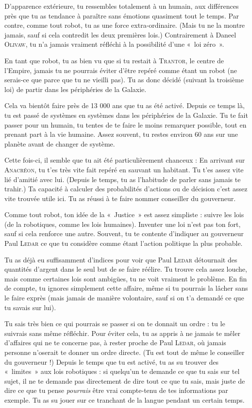 \documentclass{article}
\begin{document}
{D’apparence extérieure, tu ressembles totalement à un humain, aux différences près que tu as tendance à paraître sans émotions quasiment tout le temps.
Par contre, comme tout robot, tu as une force extra-ordinaire. (Mais tu ne la montre jamais, sauf si cela contredit les deux premières lois.)
Contrairement à Daneel \textsc{Olivaw}, tu n’a jamais vraiment réfléchi à la possibilité d’une «~loi zéro~».

En tant que robot, tu as bien vu que si tu restait à \textsc{Trantor}, le centre de l’Empire, jamais tu ne pourrais éviter d’être repéré comme étant un robot (ne serais-ce que parce que tu ne vieilli pas).
Tu as donc décidé (suivant la troisième loi) de partir dans les périphéries de la Galaxie.

Cela va bientôt faire près de 13 000 ans que tu as été activé.
Depuis ce temps là, tu est passé de systèmes en systèmes dans les périphéries de la Galaxie.
Tu te fait passer pour un humain, tu tentes de te faire le moins remarquer possible, tout en prenant part à la vie humaine.
Assez souvent, tu restes environ 60 ans sur une planète avant de changer de système.

Cette fois-ci, il semble que tu ait été particulièrement chanceux :
En arrivant sur \textsc{Anacréon}, tu t’es très vite fait repéré en sauvant un habitant.
Tu t’es assez vite lié d’amitié avec lui. (Depuis le temps, tu as l’habitude de parler sans jamais te trahir.)
Ta capacité à calculer des probabilités d’actions ou de décision c’est assez vite trouvée utile ici.
Tu as réussi à te faire nommer conseiller du gouverneur.

Comme tout robot, ton idée de la «~Justice~» est assez simpliste : suivre les lois (de la robotiques, comme les lois humaines).
Inventer une loi n’est pas ton fort, sauf si cela renforce une autre.
Souvent, tu te contente d’indiquer au gouverneur Paul \textsc{Ledar} ce que tu considère comme étant l’action politique la plus probable.

Tu as déjà eu suffisamment d’indices pour voir que Paul \textsc{Ledar} détournait des quantités d’argent dans le seul but de se faire réélire.
Tu trouve cela assez louche, mais comme certaines lois sont ambigües, tu ne voit vraiment le problème.
En fin de compte, tu ignores simplement cette affaire, même si tu pourrais la lâcher sans le faire exprès (mais jamais de manière volontaire, sauf si on t’a demandé ce que tu savais sur lui).

Tu sais très bien ce qui pourrais se passer si on te donnait un ordre : tu le suivrais sans même réfléchir.
Pour éviter cela, tu as appris à ne jamais te mêler d’affaires qui ne te concerne pas, à rester proche de Paul \textsc{Ledar}, où jamais personne n’oserait te donner un ordre directe. (Tu est tout de même le conseiller du gouverneur !)
Depuis le temps que tu est activé, tu as su trouver des «~limites~» aux lois robotiques : si quelqu’un te demande ce que tu sais sur tel sujet, il ne te demande pas directement de dire tout ce que tu sais, mais juste de dire ce que tu pense \emph{pourrais} être vrai compte-tenu de tes informations par exemple.
Tu as su jouer sur ce tranchant de la langue pendant un certain temps.

}
\end{document}
